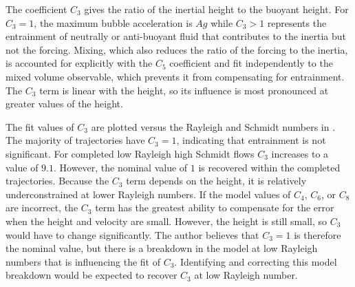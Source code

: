 The coefficient $C_3$ gives the ratio of the inertial height to the buoyant height.
For $C_3 = 1$, the maximum bubble acceleration is $A g$ while $C_3 > 1$ represents the entrainment of neutrally or anti-buoyant fluid that contributes to the inertia but not the forcing.
Mixing, which also reduces the ratio of the forcing to the inertia, is accounted for explicitly with the $C_5$ coefficient and fit independently to the mixed volume observable, which prevents it from compensating for entrainment.
The $C_3$ term is linear with the height, so its influence is most pronounced at greater values of the height.

The fit values of $C_3$ are plotted versus the Rayleigh and Schmidt numbers in .
The majority of trajectories have $C_3 = 1$, indicating that entrainment is not significant.
For completed low Rayleigh high Schmidt flows $C_3$ increases to a value of $9.1$.
However, the nominal value of $1$ is recovered within the completed trajectories.
Because the $C_3$ term depends on the height, it is relatively underconstrained at lower Rayleigh numbers.
If the model values of $C_4$, $C_6$, or $C_8$ are incorrect, the $C_3$ term has the greatest ability to compensate for the error when the height and velocity are small.
However, the height is still small, so $C_3$ would have to change significantly.
The author believes that $C_3 = 1$ is therefore the nominal value, but there is a breakdown in the model at low Rayleigh numbers that is influencing the fit of $C_3$.
Identifying and correcting this model breakdown would be expected to recover $C_3$ at low Rayleigh number.

